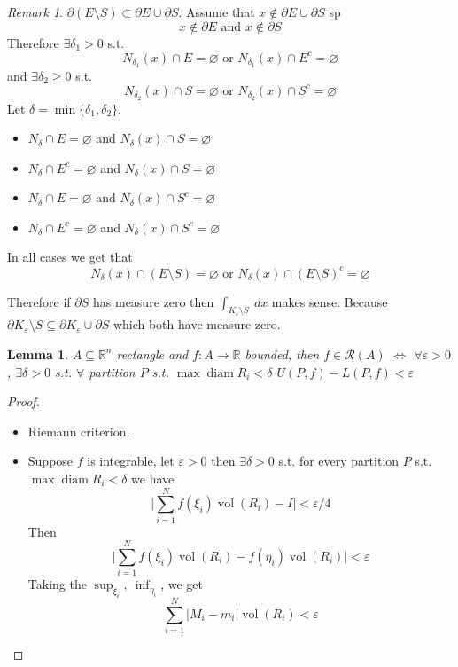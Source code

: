 \documentclass[11pt,openany]{book}
\theoremstyle{plain}
\newtheorem{lemma}{Lemma}[chapter]
\theoremstyle{definition}
\theoremstyle{remark}
\newtheorem{remark}{Remark}[chapter]
\newcommand{\R}{\mathbb{R}}
\newcommand{\set}[1]{\{ #1 \}}
\newcommand{\vol}{\operatorname{vol}}
\newcommand{\abs}[1]{\lvert #1 \rvert}
\begin{document}
\begin{remark}
    $\partial (E \setminus S) \subset \partial E \cup \partial S$. Assume that $x \not\in \partial E \cup \partial S$ sp 
    $$x \not\in \partial E \text{ and } x \not\in \partial S$$
    Therefore $\exists \delta_1 > 0$ s.t. 
    $$N_{\delta_1}(x) \cap E = \varnothing \text{ or } N_{\delta_1} (x) \cap E^c = \varnothing$$
    and $\exists \delta_2 \ge 0$ s.t. 
    $$N_{\delta_2} (x) \cap S = \varnothing \text{ or } N_{\delta_2} (x) \cap S^c = \varnothing$$
    Let $\delta = \min \set{\delta_1, \delta_2}$, 
    \begin{itemize}
        \item $N_\delta \cap E = \varnothing$ and $N_\delta(x) \cap S = \varnothing$
    
        \item $N_\delta \cap E^c = \varnothing$ and $N_\delta(x) \cap S = \varnothing$
        \item $N_\delta \cap E = \varnothing$ and $N_\delta(x) \cap S^c = \varnothing$
        
        \item $N_\delta \cap E^c = \varnothing$ and $N_\delta(x) \cap S^c = \varnothing$
    \end{itemize}
    In all cases we get that 
    $$N_\delta(x) \cap (E \setminus S) = \varnothing \text{ or } N_\delta(x) \cap (E \setminus S)^c = \varnothing$$

    Therefore if $\partial S$ has measure zero then $\int_{K_\varepsilon \setminus S} \ dx$ makes sense. 
    Because $\partial K_\varepsilon \setminus S \subseteq \partial K_\varepsilon \cup \partial S$ which both have measure zero.
\end{remark}

\begin{lemma}
    $A \subseteq \R^n$ rectangle and $f \colon A \to \R$ bounded, then $f \in \mathcal{R}(A)$ $\iff$ $\forall \varepsilon > 0$, $\exists \delta > 0$ s.t. 
    $\forall$ partition $P$ s.t. $\max \operatorname{diam} R_i < \delta$ $U(P,f) - L(P,f) < \varepsilon$
\end{lemma}

\begin{proof}
    \begin{itemize}
        \item[$\impliedby$] Riemann criterion. 
        \item[$\implies$] Suppose $f$ is integrable, let $\varepsilon > 0$ then $\exists \delta > 0$ s.t. for every partition 
        $P$ s.t. $\max \operatorname{diam} R_i < \delta$ we have 
        $$\abs{\sum_{i=1}^N f(\xi_i) \vol (R_i) - I} < \varepsilon/4$$
        Then 
        $$\abs{\sum_{i=1}^N f(\xi_i) \vol (R_i) - f(\eta_i) \vol (R_i)} < \varepsilon$$
        Taking the $\sup_{\xi_i}, \ \inf_{\eta_i}$, we get 
        $$\sum_{i=1}^N \abs{M_i - m_i} \vol (R_i) < \varepsilon$$
    \end{itemize}
\end{proof}
\end{document}
